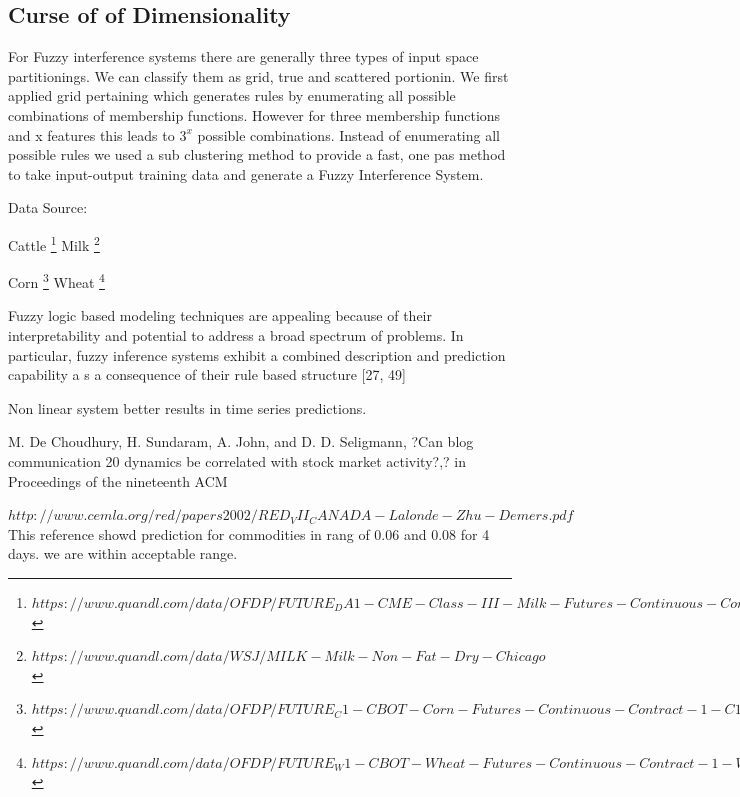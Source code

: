 \subsection{Curse of of Dimensionality}

For Fuzzy interference systems there are generally three types of input space partitionings. We can classify them as grid, true and scattered portionin. We first applied grid pertaining which generates rules by enumerating all possible combinations of membership functions. However for three membership functions and x features this leads to $3^x$ possible combinations. Instead of enumerating all possible rules we used a sub clustering method to provide a fast, one pas method to take input-output training data and generate a Fuzzy Interference System. 






Data Source: 

Cattle \footnote{$https://www.quandl.com/data/OFDP/FUTURE_DA1-CME-Class-III-Milk-Futures-Continuous-Contract-1-DA1-Front-Month$}
Milk \footnote{$https://www.quandl.com/data/WSJ/MILK-Milk-Non-Fat-Dry-Chicago$}

Corn \footnote{$https://www.quandl.com/data/OFDP/FUTURE_C1-CBOT-Corn-Futures-Continuous-Contract-1-C1-Front-Month$}
Wheat \footnote{$https://www.quandl.com/data/OFDP/FUTURE_W1-CBOT-Wheat-Futures-Continuous-Contract-1-W1-Front-Month$}







Fuzzy logic based modeling techniques are appealing because of their interpretability and potential to address a broad spectrum of problems. In particular, fuzzy inference systems exhibit a combined description and prediction capability a s a consequence of their rule based structure [27, 49]

Non linear system better results in time series predictions. 

M. De Choudhury, H. Sundaram, A. John, and D. D. Seligmann, ?Can blog communication 
20
dynamics be correlated with stock market activity?,? in Proceedings of the nineteenth ACM 




$http://www.cemla.org/red/papers2002/RED_VII_CANADA-Lalonde-Zhu-Demers.pdf$ This reference showd prediction for commodities in rang of 0.06 and 0.08 for 4 days. we are within acceptable range. 


 
